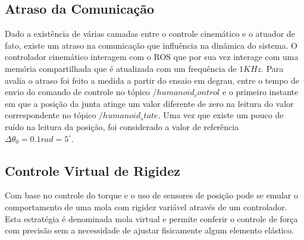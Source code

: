 


\subsection{Atraso da Comunicação}

Dado a existência de várias camadas entre o controle cinemático e o atuador de fato, existe um atraso na comunicação que influência na dinâmica do sistema. O controlador cinemático interagem com o ROS que por sua vez interage com uma memória compartilhada que é atualizada com um frequência de $1 KHz$. Para avalia o atraso foi feito a medida a partir do ensaio em degrau, entre o tempo de envio do comando de controle no tópico $/humanoid_control$ e o primeiro instante em que a posição da junta atinge um valor diferente de zero na leitura do valor correspondente no tópico $/humanoid_state$. Uma vez que existe um pouco de ruído na leitura da posição, foi considerado a valor de referência $\Delta\theta_0 = 0.1 rad = 5^\circ$.


\subsection{Controle Virtual de Rigidez}


Com base no controle do torque e o uso de sensores de posição pode se emular o comportamento de uma mola com rigidez variável através de um controlador. Esta estratégia é denominada mola virtual e permite conferir o controle de força com precisão sem a necessidade de ajustar fisicamente algum elemento elástico.

